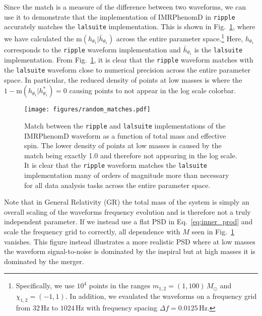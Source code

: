 \documentclass[twocolumn]{aastex631}
\newcommand{\ripple}{\texttt{ripple}\xspace}
\newcommand{\lalsuite}{\texttt{lalsuite}\xspace}
\begin{document}
Since the match is a measure of the difference between two waveforms, we can use it to demonstrate that the implementation of IMRPhenomD in \ripple accurately matches the \lalsuite implementation.
This is shown in Fig.~\ref{fig:match}, where we have calculated the $\mathrm{m}(h_{\theta_1}|\bar{h}_{\theta_1})$ across the entire parameter space.\footnote{
    Specifically, we use $10^4$ points in the ranges $m_{1,2} = (1,100)\,M_{\odot}$ and $\chi_{1,2} = (-1,1)$. In addition, we evaulated the waveforms on a frequency grid from $32\,$Hz to $1024\,$Hz with frequency spacing $\Delta f = 0.0125 \,$Hz.
}
Here, $h_{\theta_1}$ corresponds to the \ripple waveform implementation and $\bar{h}_{\theta_1}$ is the \lalsuite implementation. 
From Fig.~\ref{fig:match}, it is clear that the \ripple waveform matches with the \lalsuite waveform close to numerical precision across the entire parameter space.
In particular, the reduced density of points at low masses is where the $1-\mathrm{m}(h_{\theta_1}|h^{*}_{\theta_1})=0$ causing points to not appear in the log scale colorbar.
\begin{figure}[t]
    \begin{centering}
        \texttt{[image: figures/random\_matches.pdf]}
        \caption{
            Match between the \ripple and \lalsuite implementations of the IMRPhenomD waveform as a function of total mass and effective spin. 
            The lower density of points at low masses is caused by the match being exactly 1.0 and therefore not appearing in the log scale. 
            It is clear that the \ripple waveform matches the \lalsuite implementation many of orders of magnitude more than necessary for all data analysis tasks across the entire parameter space.
        }
        \label{fig:match}
    \end{centering}
\end{figure}

Note that in General Relativity (GR) the total mass of the system is simply an overall scaling of the waveforms frequency evolution and is therefore not a truly independent parameter.
If we instead use a flat PSD in Eq.~\ref{eq:inner_prod} and scale the frequency grid to correctly, all dependence with $M$ seen in Fig.~\ref{fig:match} vanishes. 
This figure instead illustrates a more realistic PSD where at low masses the waveform signal-to-noise is dominated by the inspiral but at high masses it is dominated by the merger.
\end{document}
